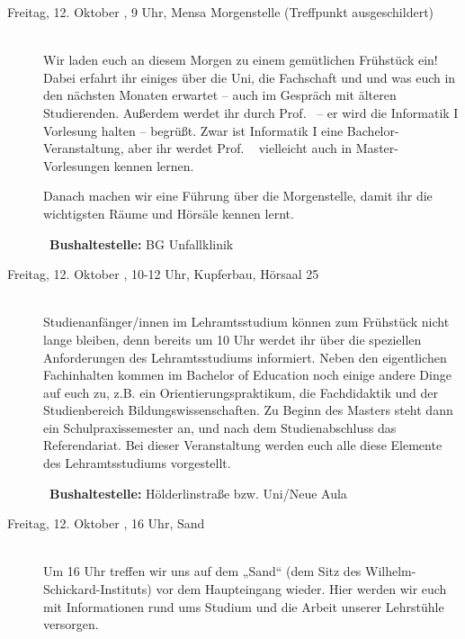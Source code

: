 \begin{description}
\item[Freitag, 12. Oktober \Jahr, 9 Uhr, Mensa Morgenstelle (Treffpunkt ausgeschildert)]\ \\
Wir laden euch an diesem Morgen zu einem gemütlichen Frühstück ein! Dabei erfahrt ihr einiges über die Uni, die Fachschaft und und was euch in den nächsten Monaten erwartet -- auch im Gespräch mit älteren
Studierenden. Außerdem werdet ihr durch Prof. \Infoprof~-- er wird die Informatik I Vorlesung halten -- begrüßt.
\ifmaster Zwar ist Informatik I eine Bachelor-Veranstaltung, aber ihr werdet Prof. \Infoprof~ vielleicht auch in Master-Vorlesungen kennen lernen. \fi 

Danach machen wir eine Führung über die Morgenstelle, damit ihr die wichtigsten Räume und Hörsäle kennen lernt. 

~\textbf{Bushaltestelle:} BG Unfallklinik

\iflehramt
\item[Freitag, 12. Oktober \Jahr, 10-12 Uhr, Kupferbau, Hörsaal 25]\ \\
Studienanfänger/innen im Lehramtsstudium können zum Frühstück nicht lange bleiben, denn bereits um 10 Uhr werdet ihr über die speziellen 
Anforderungen des Lehramtsstudiums informiert. Neben den eigentlichen Fachinhalten kommen im 
Bachelor of Education noch einige andere Dinge auf euch zu, z.B. ein Orientierungspraktikum, die 
Fachdidaktik und der Studienbereich Bildungswissenschaften. Zu Beginn des Masters steht dann 
ein Schulpraxissemester an, und nach dem Studienabschluss das Referendariat. Bei dieser Veranstaltung werden euch 
alle diese Elemente des Lehramtsstudiums vorgestellt.

~\textbf{Bushaltestelle:} Hölderlinstraße bzw. Uni/Neue Aula
\fi


\item[Freitag, 12. Oktober \Jahr, 16 Uhr, Sand]\ \\
Um 16 Uhr treffen wir uns auf dem „Sand“ (dem Sitz des Wilhelm-Schickard-Instituts) vor dem Haupteingang
wieder. Hier werden wir euch mit Informationen rund ums Studium und die Arbeit unserer Lehrstühle versorgen.


\end{description}
